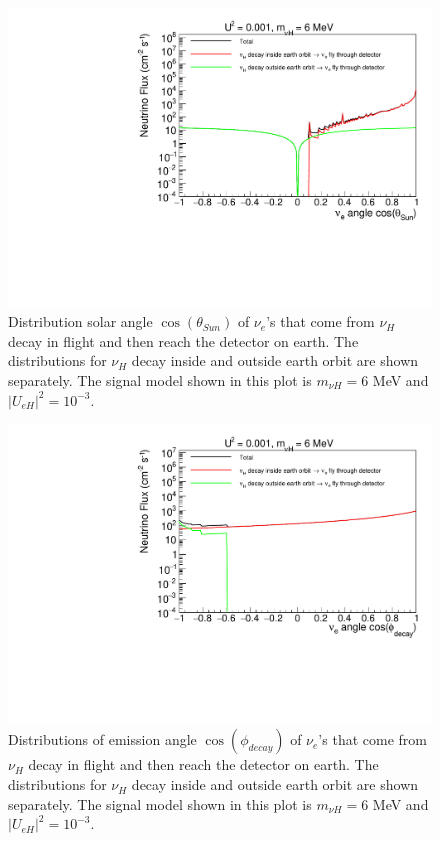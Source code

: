 \documentclass[%
 reprint,
 amsmath,amssymb,
 aps,
 prd,
floatfix,
twocolumn,
]{revtex4-1}
\begin{document}
\begin{figure}[!htbp]
\includegraphics[width=0.99\columnwidth]{../plots/DecayInFlightNuLCosthetaSun_U0.001_M6.0_InsideOutside_linXlogY.pdf}
\caption{Distribution solar angle $\cos(\theta_{Sun})$ of $\nu_e$'s that come from $\nu_H$ decay in flight and then reach the detector on earth. The distributions for $\nu_H$ decay inside and outside earth orbit are shown separately. The signal model shown in this plot is $m_{\nu H} = 6$ MeV and $|U_{eH}|^2 = 10^{-3}$.}
\label{fig:DecayInFlightTheta_U0.001_M6} 
\end{figure}


\begin{figure}[!htbp]
\includegraphics[width=0.99\columnwidth]{../plots/DecayInFlightNuLCosphiSun_U0.001_M6.0_InsideOutside_linXlogY.pdf}
\caption{Distributions of emission angle $\cos(\phi_{decay})$ of $\nu_e$'s that come from $\nu_H$ decay in flight and then reach the detector on earth. The distributions for $\nu_H$ decay inside and outside earth orbit are shown separately. The signal model shown in this plot is $m_{\nu H} = 6$ MeV and $|U_{eH}|^2 = 10^{-3}$.}
\label{fig:DecayInFlightPhi_U0.001_M6} 
\end{figure}
\end{document}
